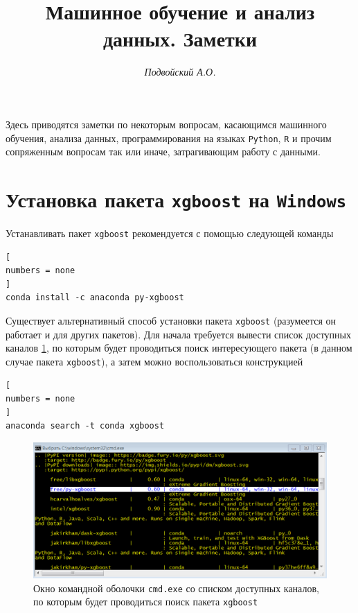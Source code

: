 \documentclass[%
	11pt,
	a4paper,
	utf8,
		]{article}
\begin{document}
\title{Машинное обучение и анализ данных. Заметки}

\author{\itshape Подвойский А.О.}

\date{}
\maketitle

\thispagestyle{fancy}

Здесь приводятся заметки по некоторым вопросам, касающимся машинного обучения, анализа данных, программирования на языках \texttt{Python}, \texttt{R} и прочим сопряженным вопросам так или иначе, затрагивающим работу с данными.

\tableofcontents


\section{Установка пакета \texttt{xgboost} на \texttt{Windows}}

Устанавливать пакет \texttt{xgboost} рекомендуется с помощью следующей команды

\begin{lstlisting}[
numbers = none
]
conda install -c anaconda py-xgboost 
\end{lstlisting}

Существует альтернативный способ установки пакета \texttt{xgboost} (разумеется он работает и для других пакетов). Для начала требуется вывести список доступных каналов \ref{fig:xgboost_conda_search}, по которым будет проводиться поиск интересующего пакета (в данном случае пакета \texttt{xgboost}), а затем можно воспользоваться конструкцией

\begin{lstlisting}[
numbers = none
]
anaconda search -t conda xgboost
\end{lstlisting}

\begin{figure}[h]
	\centering
	\includegraphics[scale=0.85]{figures/xgboost_conda_search.png}
	\caption{Окно командной оболочки \texttt{cmd.exe} со списком доступных каналов, по которым будет проводиться поиск пакета \texttt{xgboost} }\label{fig:xgboost_conda_search}
\end{figure}
\end{document}
